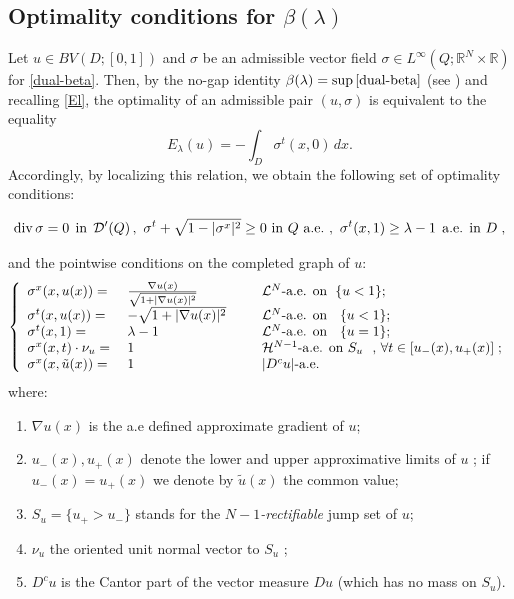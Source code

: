 \documentclass[reqno,11pt]{amsart}
\theoremstyle{definition}
\numberwithin{equation}{section}
\def\ov{\overline}
\DeclareMathOperator{\Div}{div}
\newcommand{\LL}{\mathcal{L}}
\newcommand{\HH}{\mathcal{H}}
\newcommand{\DD}{\mathcal{D}}
\newcommand{\RR}{\mathbb{R}}
\newcommand{\tinm}[1]{\text{\;#1\;}}
\newcommand{\1}{{{\bf 1}\kern-0,28em\rm l}}
\def\l{\lambda}
\begin{document}
\subsection*{Optimality conditions for \texorpdfstring{$\beta(\lambda)$}{beta}}


Let $u \in BV(D; [0,1])$ and $\sigma$  be an admissible vector field $\sigma\in L^\infty(Q;\RR^N \times \RR)$ for  \eqref{dual-beta}. Then, by the no-gap identity $\beta(\lambda)= \sup \eqref{dual-beta}$ (see \cite[Thm 3]{boufra2018}) and recalling \eqref{El},  the optimality of an admissible pair $(u,\sigma)$ is equivalent to the equality 
 $$E_\l(u)=  -\int_D \sigma^t(x,0) \, dx  .$$
Accordingly, by localizing this relation, we obtain the following set of optimality conditions:

\begin{equation}\label{admi-beta}
\Div\sigma =0\, \tinm{in} \, \DD'(Q)\, ,\ \sigma^t + \sqrt{1- |\sigma^x|^2}\ge 0\ \text{in $Q$ a.e.}\ ,\ \sigma^t(x,1) \ge \lambda -1 \, \tinm{a.e. in $D$} ,
 \end{equation}
 
 and the pointwise conditions  on the completed graph of $u$:
% 
% 
\begin{equation}\label{opti-beta}
 \left\{
 \begin{array}{llll}
\sigma^x(x,u(x)) =&\; \frac{\nabla u(x)}{\sqrt{1+|\nabla u(x)|^2}} && \tinm{ $\LL^N$-a.e. on}\ \{u <1\} ;
\\
\sigma^t(x,u(x)) =&\; - \sqrt{1+|\nabla u(x)|^2} && \tinm{ $\LL^N$-a.e. on }\ \{u <1\} ;
\\
\sigma^t(x,1) =&\; \lambda -1 && \tinm{ $\LL^N$-a.e. on }\ \{u=1\}; 
\\
\sigma^x(x,t)\cdot\nu_u =&\; 1  && \tinm{ $\HH^{N-1}$-a.e. on $S_u$ \ ,\ $\forall t \in [u_-(x), u_+(x)]$};
\\
\sigma^x(x,\tilde u(x)) =& \; 1 && \tinm{ $|D^cu|$-a.e.   }
\end{array}
\right.
\end{equation}
where:
\begin{enumerate}
\item [-] $\nabla u(x)$ is the  a.e defined approximate gradient of $u$; 
\item [-] $u_-(x), u_+(x)$ denote the lower and upper approximative limits of $u$ ; if $u_-(x)= u_+(x)$ we denote by $\tilde u(x)$ the common value;
\item[-] $S_u = \{u_+>u_-\} $ stands for the \emph{$N-1$-rectifiable} jump set of $u$; 
\item[-] $\nu_u$ the oriented unit normal vector to $S_u$ ;
\item [-] $D^c u$ is the Cantor part of the vector measure $Du$ (which has no mass on $S_u$). 
\end{enumerate}
\end{document}
